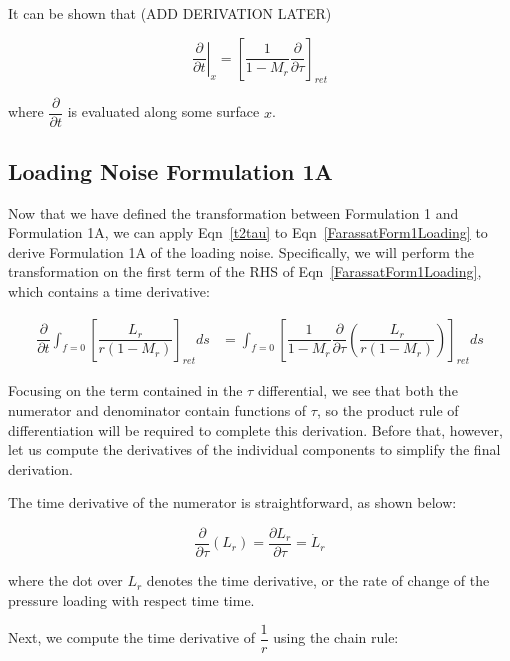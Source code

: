 \documentclass[]{aiaa-tc}%
\begin{document}
It can be shown that \color{red} (ADD DERIVATION LATER) \color{black}

\begin{equation} \label{t2tau}
\left. \dfrac{\partial}{\partial t} \right|_x
= \left[ \dfrac{1}{1 - M_r} \dfrac{\partial}{\partial \tau} \right]_{ret}
\end{equation}

\noindent where $\dfrac{\partial}{\partial t}$ is evaluated along some surface $x$.



\subsection{Loading Noise Formulation 1A}

Now that we have defined the transformation between Formulation 1 and Formulation 1A, we can apply Eqn~\ref{t2tau} to Eqn~\ref{FarassatForm1Loading} to derive Formulation 1A of the loading noise.  Specifically, we will perform the transformation on the first term of the RHS of Eqn~\ref{FarassatForm1Loading}, which contains a time derivative:

\begin{align*}
\dfrac{\partial}{\partial t}
      \int_{f=0} \left[ \dfrac{L_r}{r   (1 - M_r)} \right]_{ret} ds
&= \int_{f=0} \left[
    \dfrac{1}{1 - M_r} \dfrac{\partial}{\partial \tau}
    \left( \dfrac{L_r}{r   (1 - M_r)}  \right)
    \right]_{ret} ds
\end{align*}

Focusing on the term contained in the $\tau$ differential, we see that both the numerator and denominator contain functions of $\tau$, so the product rule of differentiation will be required to complete this derivation.  Before that, however, let us compute the derivatives of the individual components to simplify the final derivation.

The time derivative of the numerator is straightforward, as shown below:

\begin{equation} \label{DerL}
\dfrac{\partial}{\partial\tau} \left( L_r \right)
    = \dfrac{\partial L_r}{\partial\tau}
    = \dot{L}_r
\end{equation}

\noindent where the dot over $L_r$ denotes the time derivative, or the rate of change of the pressure loading with respect time time.

Next, we compute the time derivative of $\dfrac{1}{r}$ using the chain rule:
\end{document}
